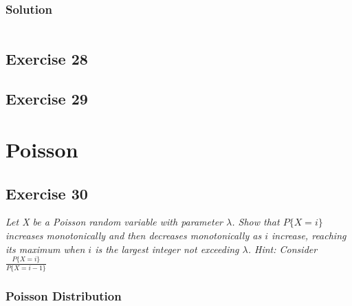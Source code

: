 \documentclass[12pt,a4paper]{article}
\begin{document}
\subsubsection{Solution}

\[
\]


\subsection{Exercise 28}

\subsection{Exercise 29}

\section{Poisson}

\subsection{Exercise 30}

\textit{Let X be a Poisson random variable with parameter $\lambda$. Show that $P\{X = i\}$ increases monotonically and then decreases monotonically as $i$ increase, reaching its maximum when $i$ is the largest integer not exceeding $\lambda$. Hint: Consider $\frac{P\{X = i\}}{P\{X = i-1\}}$}

\subsubsection{Poisson Distribution}
\end{document}
